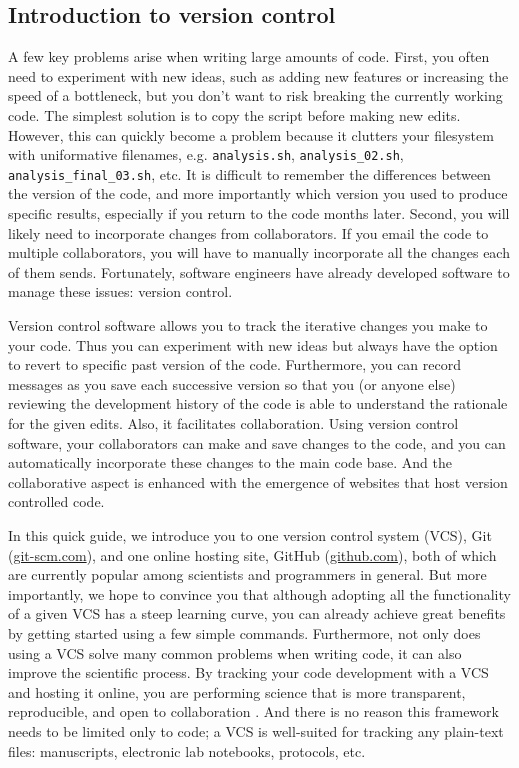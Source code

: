 \subsection{Introduction to version control}

A few key problems arise when writing large amounts of code. First, you often need to experiment with new ideas, such as adding new features or increasing the speed of a bottleneck, but you don't want to risk breaking the currently working code. The simplest solution is to copy the script before making new edits. However, this can quickly become a problem because it clutters your filesystem with uniformative filenames, e.g. \verb|analysis.sh|, \verb|analysis_02.sh|, \verb|analysis_final_03.sh|, etc. It is difficult to remember the differences between the version of the code, and more importantly which version you used to produce specific results, especially if you return to the code months later. Second, you will likely need to incorporate changes from collaborators. If you email the code to multiple collaborators, you will have to manually incorporate all the changes each of them sends. Fortunately, software engineers have already developed software to manage these issues: version control.

Version control software allows you to track the iterative changes you make to your code. Thus you can experiment with new ideas but always have the option to revert to specific past version of the code. Furthermore, you can record messages as you save each successive version so that you (or anyone else) reviewing the development history of the code is able to understand the rationale for the given edits. Also, it facilitates collaboration. Using version control software, your collaborators can make and save changes to the code, and you can automatically incorporate these changes to the main code base. And the collaborative aspect is enhanced with the emergence of websites that host version controlled code.

In this quick guide, we introduce you to one version control system (VCS), Git (\href{http://git-scm.com/}{git-scm.com}), and one online hosting site, GitHub (\href{https://github.com}{github.com}), both of which are currently popular among scientists and programmers in general. But more importantly, we hope to convince you that although adopting all the functionality of a given VCS has a steep learning curve, you can already achieve great benefits by getting started using a few simple commands. Furthermore, not only does using a VCS solve many common problems when writing code, it can also improve the scientific process. By tracking your code development with a VCS and hosting it online, you are performing science that is more transparent, reproducible, and open to collaboration \cite{23448176}. And there is no reason this framework needs to be limited only to code; a VCS is well-suited for tracking any plain-text files: manuscripts, electronic lab notebooks, protocols, etc.